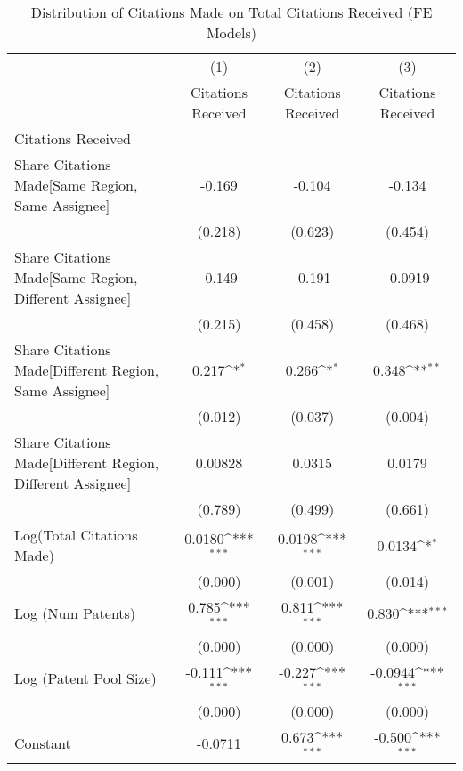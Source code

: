 {
\def\sym#1{\ifmmode^{#1}\else\(^{#1}\)\fi}
\begin{longtable}{l*{3}{c}}
\caption{Distribution of Citations Made on Total Citations Received (FE Models)  \label{model123}}\\
\hline\hline\endfirsthead\hline\endhead\hline\endfoot\endlastfoot
                &\multicolumn{1}{c}{(1)}&\multicolumn{1}{c}{(2)}&\multicolumn{1}{c}{(3)}\\
                &\multicolumn{1}{c}{Citations Received}&\multicolumn{1}{c}{Citations Received}&\multicolumn{1}{c}{Citations Received}\\
\hline
Citations Received&                  &                  &                  \\
Share Citations Made[Same Region, Same Assignee]&   -0.169         &   -0.104         &   -0.134         \\
                &  (0.218)         &  (0.623)         &  (0.454)         \\
Share Citations Made[Same Region, Different Assignee]&   -0.149         &   -0.191         &  -0.0919         \\
                &  (0.215)         &  (0.458)         &  (0.468)         \\
Share Citations Made[Different Region, Same Assignee]&    0.217\sym{*}  &    0.266\sym{*}  &    0.348\sym{**} \\
                &  (0.012)         &  (0.037)         &  (0.004)         \\
Share Citations Made[Different Region, Different Assignee]&  0.00828         &   0.0315         &   0.0179         \\
                &  (0.789)         &  (0.499)         &  (0.661)         \\
Log(Total Citations Made)&   0.0180\sym{***}&   0.0198\sym{***}&   0.0134\sym{*}  \\
                &  (0.000)         &  (0.001)         &  (0.014)         \\
Log (Num Patents)&    0.785\sym{***}&    0.811\sym{***}&    0.830\sym{***}\\
                &  (0.000)         &  (0.000)         &  (0.000)         \\
Log (Patent Pool Size)&   -0.111\sym{***}&   -0.227\sym{***}&  -0.0944\sym{***}\\
                &  (0.000)         &  (0.000)         &  (0.000)         \\
Constant        &  -0.0711         &    0.673\sym{***}&   -0.500\sym{***}\\

\end{longtable}}
